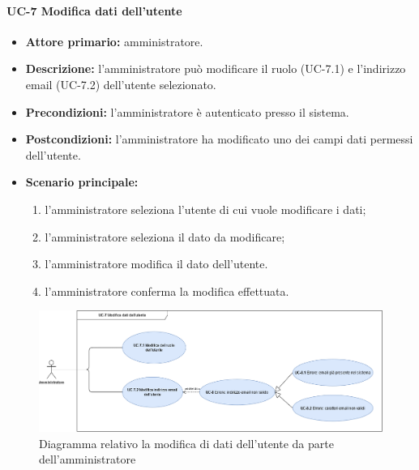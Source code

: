 \paragraph{UC-7 Modifica dati dell'utente}
\begin{itemize}
	\item \textbf{Attore primario:} amministratore.

	\item \textbf{Descrizione:} l'amministratore può modificare il ruolo (UC-7.1) e l'indirizzo email (UC-7.2) dell'utente selezionato.
	
	\item \textbf{Precondizioni:} l'amministratore è autenticato presso il sistema.

	\item \textbf{Postcondizioni:} l'amministratore ha modificato uno dei campi dati permessi dell'utente.

	\item \textbf{Scenario principale:}
	\begin{enumerate}
    	\item  l'amministratore seleziona l'utente di cui vuole modificare i dati;
    	\item  l'amministratore seleziona il dato da modificare;
    	\item l'amministratore modifica il dato dell'utente.
    	\item l'amministratore conferma la modifica effettuata.
	\end{enumerate}
\end{itemize}

\begin{figure}[H]
    \centering
      \includegraphics[scale=0.35]{src/CasiDUso/immagini/ModificaUtente.png}
    \caption{Diagramma relativo la modifica di dati dell'utente da parte dell'amministratore}
\end{figure}
    
